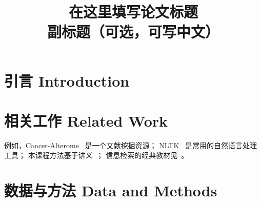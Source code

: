 \documentclass[conference]{IEEEtran}
\begin{document}
\title{在这里填写论文标题\\
\large 副标题（可选，可写中文）}

\author{
}

\maketitle

\begin{abstract}
\end{abstract}

\begin{IEEEkeywords}
\end{IEEEkeywords}

\section{引言 Introduction}

\section{相关工作 Related Work}
例如，Cancer-Alterome~\cite{canceralterome2024} 是一个文献挖掘资源；
NLTK~\cite{nltk2009} 是常用的自然语言处理工具；
本课程方法基于讲义~\cite{slides2026}；
信息检索的经典教材见~\cite{manning2008ir}。

\section{数据与方法 Data and Methods}
\end{document}
